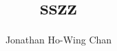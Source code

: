 \documentclass[gpscopy,twoside,balanced,onehalfspacing,11pt]{ubcdiss}
\title{sszz}
\author{Jonathan Ho\hspace{0.1em}-\hspace{-0.1em}Wing Chan}
\begin{document}
\maketitle
\makecommitteepage





\tableofcontents
\cleardoublepage

\listoftables
\cleardoublepage

\listoffigures
\cleardoublepage



\textspacing




\mainmatter
\acresetall




\begin{singlespace}
\raggedright


\end{singlespace}

\appendix


\backmatter
\printindex
\end{document}

